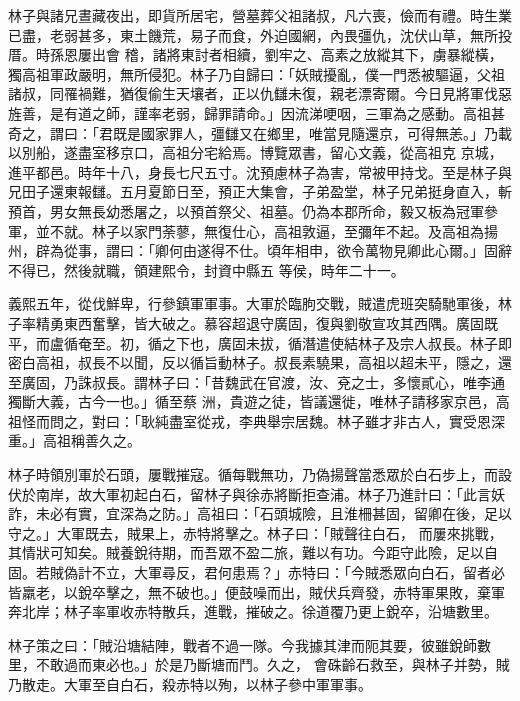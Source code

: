 \begin{pinyinscope}
 林子與諸兄晝藏夜出，即貨所居宅，營墓葬父祖諸叔，凡六喪，儉而有禮。時生業已盡，老弱甚多，東土饑荒，易子而食，外迫國網，內畏彊仇，沈伏山草，無所投厝。時孫恩屢出會
 稽，諸將東討者相續，劉牢之、高素之放縱其下，虜暴縱橫，獨高祖軍政嚴明，無所侵犯。林子乃自歸曰：「妖賊擾亂，僕一門悉被驅逼，父祖諸叔，同罹禍難，猶復偷生天壤者，正以仇讎未復，親老漂寄爾。今日見將軍伐惡旌善，是有道之師，謹率老弱，歸罪請命。」因流涕哽咽，三軍為之感動。高祖甚奇之，謂曰：「君既是國家罪人，彊讎又在鄉里，唯當見隨還京，可得無恙。」乃載以別船，遂盡室移京口，高祖分宅給焉。博覽眾書，留心文義，從高祖克
 京城，進平都邑。時年十八，身長七尺五寸。沈預慮林子為害，常被甲持戈。至是林子與兄田子還東報讎。五月夏節日至，預正大集會，子弟盈堂，林子兄弟挺身直入，斬預首，男女無長幼悉屠之，以預首祭父、祖墓。仍為本郡所命，毅又板為冠軍參軍，並不就。林子以家門荼蓼，無復仕心，高祖敦逼，至彌年不起。及高祖為揚州，辟為從事，謂曰：「卿何由遂得不仕。頃年相申，欲令萬物見卿此心爾。」固辭不得已，然後就職，領建熙令，封資中縣五
 等侯，時年二十一。



 義熙五年，從伐鮮卑，行參鎮軍軍事。大軍於臨朐交戰，賊遣虎班突騎馳軍後，林子率精勇東西奮擊，皆大破之。慕容超退守廣固，復與劉敬宣攻其西隅。廣固既平，而盧循奄至。初，循之下也，廣固未拔，循潛遣使結林子及宗人叔長。林子即密白高祖，叔長不以聞，反以循旨動林子。叔長素驍果，高祖以超未平，隱之，還至廣固，乃誅叔長。謂林子曰：「昔魏武在官渡，汝、兗之士，多懷貳心，唯李通獨斷大義，古今一也。」循至蔡
 洲，貴遊之徒，皆議還徙，唯林子請移家京邑，高祖怪而問之，對曰：「耿純盡室從戎，李典舉宗居魏。林子雖才非古人，實受恩深重。」高祖稱善久之。



 林子時領別軍於石頭，屢戰摧寇。循每戰無功，乃偽揚聲當悉眾於白石步上，而設伏於南岸，故大軍初起白石，留林子與徐赤將斷拒查浦。林子乃進計曰：「此言妖詐，未必有實，宜深為之防。」高祖曰：「石頭城險，且淮柵甚固，留卿在後，足以守之。」大軍既去，賊果上，赤特將擊之。林子曰：「賊聲往白石，
 而屢來挑戰，其情狀可知矣。賊養銳待期，而吾眾不盈二旅，難以有功。今距守此險，足以自固。若賊偽計不立，大軍尋反，君何患焉？」赤特曰：「今賊悉眾向白石，留者必皆羸老，以銳卒擊之，無不破也。」便鼓噪而出，賊伏兵齊發，赤特軍果敗，棄軍奔北岸；林子率軍收赤特散兵，進戰，摧破之。徐道覆乃更上銳卒，沿塘數里。



 林子策之曰：「賊沿塘結陣，戰者不過一隊。今我據其津而阨其要，彼雖銳師數里，不敢過而東必也。」於是乃斷塘而鬥。久之，
 會硃齡石救至，與林子并勢，賊乃散走。大軍至自白石，殺赤特以殉，以林子參中軍軍事。




\end{pinyinscope}
